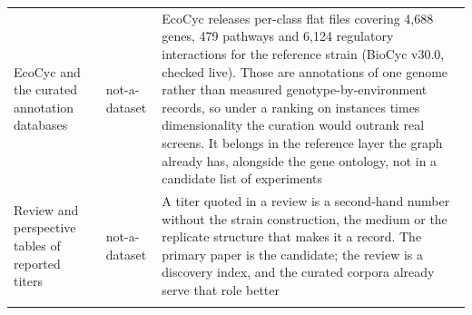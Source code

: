 \begin{longtable}{@{}L{58mm} L{28mm} L{83mm}@{}}
\addlinespace[5pt]
EcoCyc and the curated annotation databases & not-a-dataset & EcoCyc releases per-class flat files covering 4,688 genes, 479 pathways and 6,124 regulatory interactions for the reference strain (BioCyc v30.0, checked live). Those are annotations of one genome rather than measured genotype-by-environment records, so under a ranking on instances times dimensionality the curation would outrank real screens. It belongs in the reference layer the graph already has, alongside the gene ontology, not in a candidate list of experiments \\
\addlinespace[5pt]
Review and perspective tables of reported titers & not-a-dataset & A titer quoted in a review is a second-hand number without the strain construction, the medium or the replicate structure that makes it a record. The primary paper is the candidate; the review is a discovery index, and the curated corpora already serve that role better \\
\addlinespace[5pt]
\end{longtable}
\endgroup

